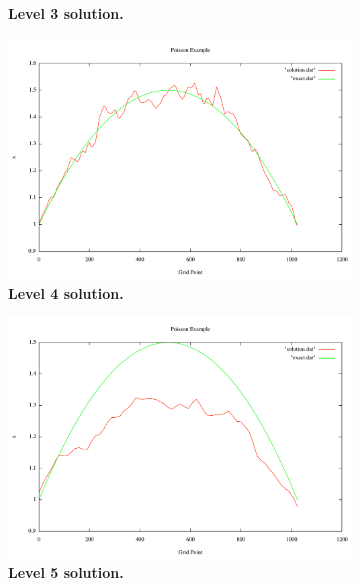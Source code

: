 \documentclass[note]{TechNote}
\begin{document}
\begin{figure}[h!]
\begin{subfigure}[b]{0.32\textwidth}
    \caption{\textbf{Level 3 solution.}}
  \end{subfigure}
  \begin{subfigure}[b]{0.32\textwidth}
    \includegraphics[width=\textwidth]{cg_4_level.pdf}
    \caption{\textbf{Level 4 solution.}}
  \end{subfigure}
  \begin{subfigure}[b]{0.32\textwidth}
    \includegraphics[width=\textwidth]{cg_5_level.pdf}
    \caption{\textbf{Level 5 solution.}}
  \end{subfigure}
  \begin{subfigure}[b]{0.32\textwidth}

\end{subfigure}
\end{figure}
\end{document}
